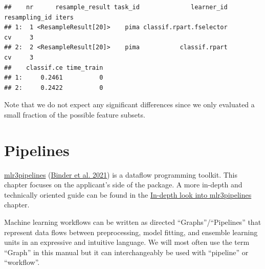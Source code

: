 \documentclass[
]{scrbook}
\newenvironment{Shaded}{\begin{snugshade}}{\end{snugshade}}
\newcommand{\AttributeTok}[1]{\textcolor[rgb]{0.77,0.63,0.00}{#1}}
\newcommand{\ConstantTok}[1]{\textcolor[rgb]{0.00,0.00,0.00}{#1}}
\newcommand{\DecValTok}[1]{\textcolor[rgb]{0.00,0.00,0.81}{#1}}
\newcommand{\FunctionTok}[1]{\textcolor[rgb]{0.00,0.00,0.00}{#1}}
\newcommand{\NormalTok}[1]{#1}
\newcommand{\OtherTok}[1]{\textcolor[rgb]{0.56,0.35,0.01}{#1}}
\newcommand{\SpecialCharTok}[1]{\textcolor[rgb]{0.00,0.00,0.00}{#1}}
\newcommand{\StringTok}[1]{\textcolor[rgb]{0.31,0.60,0.02}{#1}}
\renewenvironment{Shaded} {\begin{snugshade}\small} {\end{snugshade}}
\begin{document}
\begin{Shaded}
\end{Shaded}

\begin{verbatim}
##    nr      resample_result task_id              learner_id resampling_id iters
## 1:  1 <ResampleResult[20]>    pima classif.rpart.fselector            cv     3
## 2:  2 <ResampleResult[20]>    pima           classif.rpart            cv     3
##    classif.ce time_train
## 1:     0.2461          0
## 2:     0.2422          0
\end{verbatim}

Note that we do not expect any significant differences since we only evaluated a small fraction of the possible feature subsets.

\hypertarget{pipelines}{%
\chapter{Pipelines}\label{pipelines}}

\href{https://mlr3pipelines.mlr-org.com}{mlr3pipelines} (\protect\hyperlink{ref-mlr3pipelines}{Binder et al. 2021}) is a dataflow programming toolkit.
This chapter focuses on the applicant's side of the package.
A more in-depth and technically oriented guide can be found in the \protect\hyperlink{in-depth-pipelines}{In-depth look into mlr3pipelines} chapter.

Machine learning workflows can be written as directed ``Graphs''/``Pipelines'' that represent data flows between preprocessing, model fitting, and ensemble learning units in an expressive and intuitive language.
We will most often use the term ``Graph'' in this manual but it can interchangeably be used with ``pipeline'' or ``workflow''.
\end{document}

